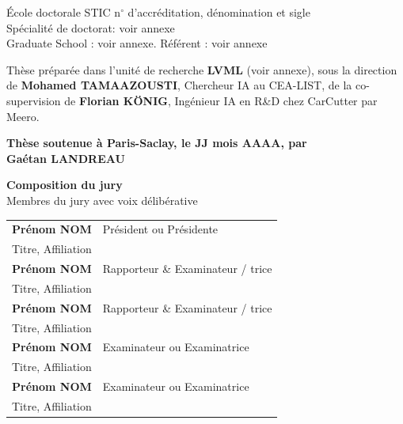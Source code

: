 \documentclass[french,12pt,a4paper]{book}
\begin{document}
\begin{titlepage}
\small École doctorale STIC n$^{\circ}$ d'accréditation, dénomination et sigle\\
\small Spécialité de doctorat: voir annexe\\
\small Graduate School : voir annexe. Référent : voir annexe \\
\vspace{6mm}

\footnotesize Thèse préparée dans l'unité de recherche \textbf{LVML} (voir annexe), sous la direction de \textbf{Mohamed TAMAAZOUSTI}, Chercheur IA au CEA-LIST, de la co-supervision de \textbf{Florian KÖNIG}, Ingénieur IA en R\&D chez CarCutter par Meero. \\
\vspace{15mm}

\textbf{Thèse soutenue à Paris-Saclay, le JJ mois AAAA, par}\\
\bigskip
\Large {\color{Prune} \textbf{Gaétan LANDREAU}} %

\vspace{\fill} %

\bigskip

\flushleft
\small {\color{Prune} \textbf{Composition du jury}}\\
{\color{Prune} \scriptsize {Membres du jury avec voix délibérative}} \\
\vspace{2mm}
\scriptsize
\begin{tabular}{|p{7cm}l}
\arrayrulecolor{Prune}
\textbf{Prénom NOM} &   Président ou Présidente\\ 
Titre, Affiliation & \\
\textbf{Prénom NOM} &  Rapporteur \& Examinateur / trice \\ 
Titre, Affiliation   &   \\ 
\textbf{Prénom NOM} &  Rapporteur \& Examinateur / trice \\ 
Titre, Affiliation  &   \\ 
\textbf{Prénom NOM} &  Examinateur ou Examinatrice \\ 
Titre, Affiliation   &   \\ 
\textbf{Prénom NOM} &  Examinateur ou Examinatrice \\ 
Titre, Affiliation   &   \\ 
 

\end{tabular} 

\end{titlepage}
\end{document}

